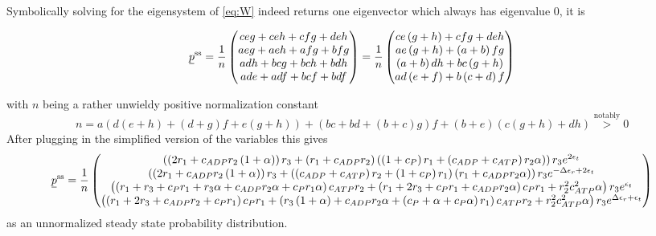 \documentclass[11pt]{article}
\newcommand{\suf}[2]{\stackunder[0.5pt]{\stackunder[1pt]{\ensuremath{#1}}{\rule{\widthof{\ensuremath{#2}}*\real{0.9}}{.1ex}}}{}}
\newcommand{\su}[1]{\suf{#1}{#1}}
\begin{document}
Symbolically solving for the eigensystem of \cref{eq:W} indeed returns one eigenvector which always has eigenvalue 0, it is
\begin{tcolorbox}
	\begin{equation}
		\su{p}^\text{ss} = \frac{1}{n} \begin{pmatrix}
			c e g + c e h + c f g + d e h \\
			a e g + a e h + a f g + b f g \\
			a d h + b c g + b c h + b d h \\
			a d e + a d f + b c f + b d f
		\end{pmatrix} = \frac{1}{n} \begin{pmatrix}
			c e \left( g + h \right) + c f g + d e h            \\
			a e \left( g + h \right) + \left( a + b \right) f g \\
			\left( a + b \right) d h + b c \left( g + h \right) \\
			a d \left( e + f \right) + b \left( c + d \right) f
		\end{pmatrix}
	\end{equation}
\end{tcolorbox}
with $n$ being a rather unwieldy positive normalization constant
\begin{equation}
	n = a \left( d \left( e + h \right) + \left( d + g \right) f + e \left( g + h \right) \right) + \left( b c + b d + \left( b + c \right) g \right) f + \left( b + e \right) \left( c \left( g + h \right) + d h \right) \overset{\text{notably}}{>} 0
\end{equation}
After plugging in the simplified version of the variables this gives
\footnotesize
\begin{equation}
	\su{p}^\text{ss} = \frac{1}{n} \begin{pmatrix}
		\left( \left( 2 r_1 + c_{ADP} r_2 \left( 1 + \alpha \right) \right) r_3 + \left( r_1 + c_{ADP} r_2 \right) \left( \left( 1 + c_P \right) r_1 + \left( c_{ADP} + c_{ATP} \right) r_2 \alpha \right) \right) r_3 e^{2 \epsilon_{t}}                         \\
		\left( \left( 2 r_1 + c_{ADP} r_2 \left( 1 + \alpha \right) \right) r_3 + \left( \left( c_{ADP} + c_{ATP} \right) r_2 + \left( 1 + c_P \right) r_1 \right) \left( r_1 + c_{ADP} r_2 \alpha \right) \right) r_3 e^{ - \Delta\epsilon_{r} + 2 \epsilon_{t}} \\
		\left( \left( r_1 + r_3 + c_P r_1 + r_3 \alpha + c_{ADP} r_2 \alpha + c_P r_1 \alpha \right) c_{ATP} r_2 + \left( r_1 + 2 r_3 + c_P r_1 + c_{ADP} r_2 \alpha \right) c_P r_1 + r_2^{2} c_{ATP}^{2} \alpha \right) r_3 e^{\epsilon_{t}}                    \\
		\left( \left( r_1 + 2 r_3 + c_{ADP} r_2 + c_P r_1 \right) c_P r_1 + \left( r_3 \left( 1 + \alpha \right) + c_{ADP} r_2 \alpha + \left( c_P + \alpha + c_P \alpha \right) r_1 \right) c_{ATP} r_2 + r_2^{2} c_{ATP}^{2} \alpha \right) r_3 e^{\Delta\epsilon_{r} + \epsilon_{t}}
	\end{pmatrix}\label{eq:pss_simp}
\end{equation}
\normalsize
as an unnormalized steady state probability distribution.
\end{document}
